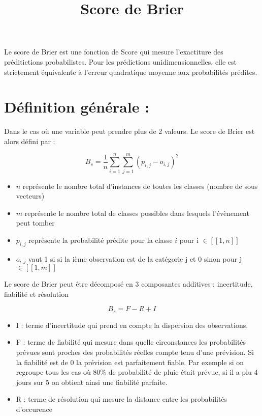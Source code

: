 \documentclass[
  letterpaper,
  DIV=11,
  numbers=noendperiod]{scrartcl}
\title{Score de Brier}
\author{}
\date{}
\providecommand{\tightlist}{%
  \setlength{\itemsep}{0pt}\setlength{\parskip}{0pt}}\usepackage{longtable,booktabs,array}
\begin{document}
\maketitle
\ifdefined\Shaded\renewenvironment{Shaded}{\begin{tcolorbox}[interior hidden, boxrule=0pt, breakable, frame hidden, borderline west={3pt}{0pt}{shadecolor}, enhanced, sharp corners]}{\end{tcolorbox}}\fi

Le score de Brier est une fonction de Score qui mesure l'exactiture des
préditictions probabilistes. Pour les prédictions unidimensionnelles,
elle est strictement équivalente à l'erreur quadratique moyenne aux
probabilités prédites.

\hypertarget{duxe9finition-guxe9nuxe9rale}{%
\section{Définition générale :}\label{duxe9finition-guxe9nuxe9rale}}

Dans le cas où une variable peut prendre plus de 2 valeurs. Le score de
Brier est alors défini par :

\[
B_s = \frac{1}{n}\sum_{i=1}^{n}\sum_{j=1}^{m}(p_{i,j} - o_{i,j})^2
\]

\begin{itemize}
\tightlist
\item
  \(n\) représente le nombre total d'instances de toutes les classes
  (nombre de sous vecteurs)
\item
  \(m\) représente le nombre total de classes possibles dans lesquels
  l'évènement peut tomber
\item
  \(p_{i,j}\) représente la probabilité prédite pour la classe \(i\)
  pour i \(\in [\![1,n]\!]\)
\item
  \(o_{i,j}\) vaut 1 si si la ième observation est de la catégorie j et
  0 sinon pour j \(\in [\![1,m]\!]\)
\end{itemize}

Le score de Brier peut être décomposé en 3 composantes additives :
incertitude, fiabilité et résolution

\[
B_s = F - R + I 
\]

\begin{itemize}
\item
  I : terme d'incertitude qui prend en compte la dispersion des
  observations.
\item
  F : terme de fiabilité qui mesure dans quelle circonstances les
  probabilités prévues sont proches des probabilités réelles compte tenu
  d'une prévision. Si la fiabilité est de 0 la prévision est
  parfaitement fiable. Par exemple si on regroupe tous les cas où 80\%
  de probabilité de pluie était prévue, si il a plu 4 jours sur 5 on
  obtient ainsi une fiabilité parfaite.
\item
  R : terme de résolution qui mesure la distance entre les probabilités
  d'occurence
\end{itemize}
\end{document}
